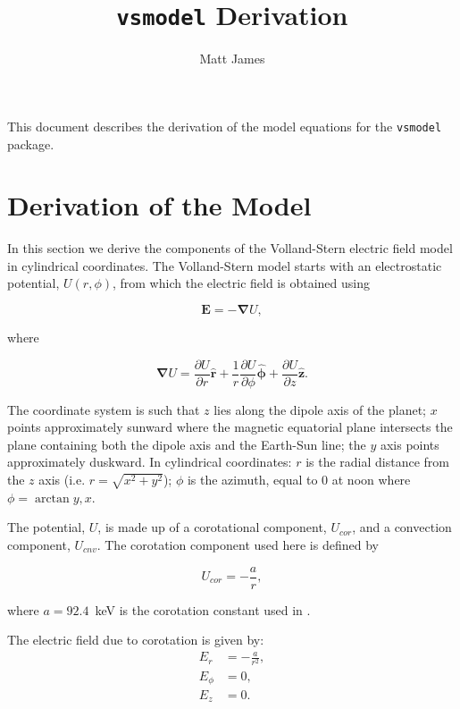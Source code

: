 \documentclass[]{article}
\title{\texttt{vsmodel} Derivation}
\author{Matt James}
\begin{document}
\maketitle

This document describes the derivation of the model equations for the \texttt{vsmodel} package.

\section{Derivation of the Model}

In this section we derive the components of the Volland-Stern electric field model \citep{Volland1973,Stern1975} in cylindrical coordinates. The Volland-Stern model starts with an electrostatic potential, $U(r,\phi)$, from which the electric field is obtained using

\begin{equation}
	\mathbf{E} = - \mathbf{\nabla} U, \label{EqEField}
\end{equation} 

where

\begin{equation}
	\mathbf{\nabla} U = \frac{\partial U}{\partial r} \mathbf{\hat{r}} + \frac{1}{r} \frac{\partial U}{\partial \phi} \mathbf{\hat{\phi}} + \frac{\partial U}{\partial z}\mathbf{\hat{z}}. \label{EqDelU}
\end{equation}

The coordinate system is such that $z$ lies along the dipole axis of the planet; $x$ points approximately sunward where the magnetic equatorial plane intersects the plane containing both the dipole axis and the Earth-Sun line; the $y$ axis points approximately duskward. In cylindrical coordinates: $r$ is the radial distance from the $z$ axis (i.e. $r = \sqrt{x^2 + y^2}$); $\phi$ is the azimuth, equal to 0 at noon where $\phi = \arctan{y,x}$.

The potential, $U$, is made up of a corotational component, $U_{cor}$, and a convection component, $U_{cnv}$. The corotation component used here is defined by

\begin{equation}
	U_{cor} = -\frac{a}{r},
\end{equation}

where $a=92.4$~keV is the corotation constant used in \citet{Zhao2017}.

The electric field due to corotation is given by:
\begin{align}
	E_r &= -\frac{a}{r^2}, \\
	E_\phi &= 0,\\
	E_z &= 0.
\end{align}
\end{document}
